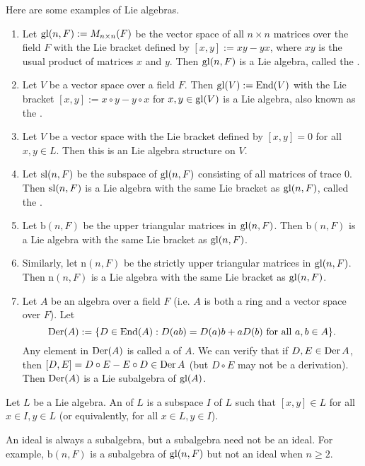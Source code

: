Here are some examples of Lie algebras.
\begin{enumerate}
    \item Let $\gl(n,F):=M_{n\times n}(F)$ be the vector space of all $n\times n$ matrices over the field $F$ with the Lie bracket defined by $[x,y]:=xy-yx$, where $xy$ is the usual product of matrices $x$ and $y$. Then $\gl(n,F)$ is a Lie algebra, called the .
    \item Let $V$ be a vector space over a field $F$. Then $\gl(V):=\operatorname{End}(V)$ with the Lie bracket $[x,y]:=x\circ y-y\circ x$ for $x,y\in\gl(V)$ is a Lie algebra, also known as the .
    \item Let $V$ be a vector space with the Lie bracket defined by $[x,y]=0$ for all $x,y\in L$. Then this is an  Lie algebra structure on $V$.
    \item Let $\sl(n,F)$ be the subspace of $\gl(n,F)$ consisting of all matrices of trace 0. Then $\sl(n,F)$ is a Lie algebra with the same Lie bracket as $\gl(n,F)$, called the .
    \item Let $\mathrm{b}(n,F)$ be the upper triangular matrices in $\gl(n,F)$. Then $\mathrm{b}(n,F)$ is a Lie algebra with the same Lie bracket as $\gl(n,F)$.
    \item Similarly, let $\mathrm{n}(n,F)$ be the strictly upper triangular matrices in $\gl(n,F)$. Then $\mathrm{n}(n,F)$ is a Lie algebra with the same Lie bracket as $\gl(n,F)$.
    \item Let $A$ be an algebra over a field $F$ (i.e. $A$ is both a ring and a vector space over $F$). Let
    \[
        \Der(A):=\{ D\in\operatorname{End}(A):D(ab)=D(a)b+aD(b) \mbox{ for all } a,b\in A \}.
    \]
    Any element in $\Der(A)$ is called a  of $A$. We can verify that if $D,E\in\Der A$, then $[D,E]=D\circ E-E\circ D \in \Der A$ (but $D \circ E$ may not be a derivation). Then $\Der(A)$ is a Lie subalgebra of $\gl(A)$.
\end{enumerate}


\begin{defn}
    Let $L$ be a Lie algebra. An  of $L$ is a subspace $I$ of $L$ such that $[x,y]\in L$ for all $x\in I,y\in L$ (or equivalently, for all $x\in L,y\in I$).
\end{defn}

An ideal is always a subalgebra, but a subalgebra need not be an ideal. For example, $\mathrm{b}(n,F)$ is a subalgebra of $\gl(n,F)$ but not an ideal when $n\geq 2$.

